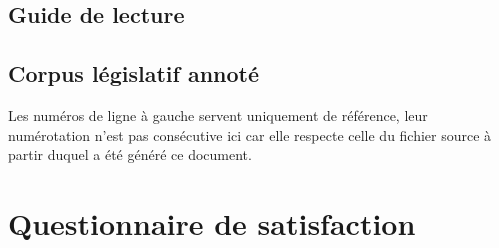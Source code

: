 \documentclass[11pt, french, a4paper]{article}
\begin{document}
\subsection{Guide de lecture}



\subsection{Corpus législatif annoté}

Les numéros de ligne à gauche servent uniquement de référence, leur numérotation
n'est pas consécutive ici car elle respecte celle du fichier source à partir
duquel a été généré ce document.



\clearpage

\section{Questionnaire de satisfaction}


\end{document}
